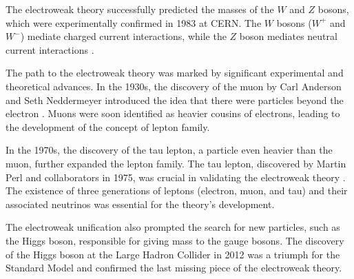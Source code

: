 The electroweak theory successfully predicted the masses of the $W$ and $Z$ bosons, which were experimentally confirmed in 1983 at CERN.
The $W$ bosons ($W^+$ and $W^-$) mediate charged current interactions, while the $Z$ boson mediates neutral current interactions \cite{Fry_Haidt}.

The path to the electroweak theory was marked by significant experimental and theoretical advances.
In the 1930s, the discovery of the muon by Carl Anderson and Seth Neddermeyer introduced the idea that there were particles beyond the electron .
Muons were soon identified as heavier cousins of electrons, leading to the development of the concept of lepton family\cite{Neddermeyer_Anderson_1937}.

In the 1970s, the discovery of the tau lepton, a particle even heavier than the muon, further expanded the lepton family.
The tau lepton, discovered by Martin Perl and collaborators in 1975, was crucial in validating the electroweak theory \cite{tau_discovery}.
The existence of three generations of leptons (electron, muon, and tau) and their associated neutrinos was essential for the theory's development.

The electroweak unification also prompted the search for new particles, such as the Higgs boson, responsible for giving mass to the gauge bosons.
The discovery of the Higgs boson at the Large Hadron Collider in 2012 was a triumph for the Standard Model and confirmed the last missing piece of the electroweak theory.



